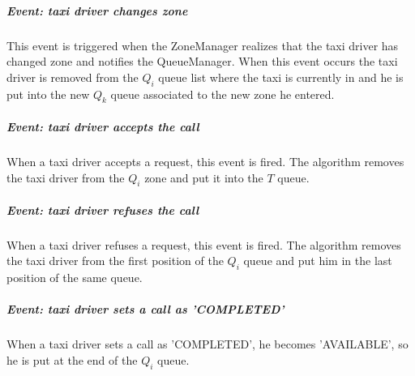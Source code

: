 \subparagraph{Event: taxi driver changes zone}
This event is triggered when the ZoneManager realizes that the taxi driver has changed zone and notifies the QueueManager.
When this event occurs the taxi driver is removed from the $Q_i$ queue list where the taxi is currently in and he is put into the new $Q_k$ queue associated to the new zone he entered.

\subparagraph{Event: taxi driver accepts the call}
When a taxi driver accepts a request, this event is fired. 
The algorithm removes the taxi driver from the $Q_i$ zone and put it into the $T$ queue.

\subparagraph{Event: taxi driver refuses the call}
When a taxi driver refuses a request, this event is fired. 
The algorithm removes the taxi driver from the first position of the $Q_i$ queue and put him in the last position of the same queue.

\subparagraph{Event: taxi driver sets a call as 'COMPLETED'}
When a taxi driver sets a call as 'COMPLETED', he becomes 'AVAILABLE', so he is put at the end of the $Q_i$ queue.